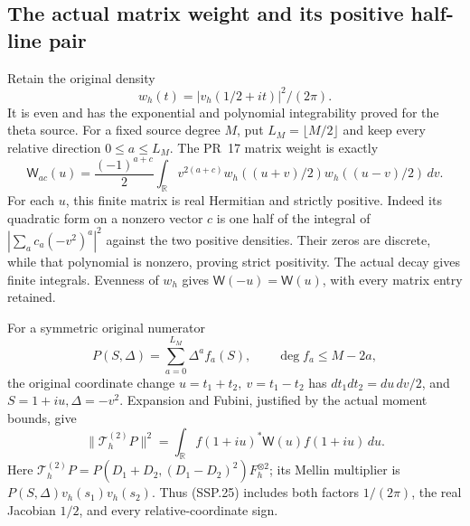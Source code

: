 \subsection{The actual matrix weight and its positive half-line pair}

Retain the original density
\[
 w_h(t)=|v_h(1/2+it)|^2/(2\pi).
 \tag{SSP.23}
\]
It is even and has the exponential and polynomial integrability
proved for the theta source.  For a fixed source degree \(M\),
put \(L_M=\lfloor M/2\rfloor\) and keep every relative direction
\(0\le a\le L_M\).  The PR~17 matrix weight is exactly
\[
 \mathsf W_{ac}(u)=\frac{(-1)^{a+c}}2
   \int_{\mathbb R}v^{2(a+c)}
       w_h((u+v)/2)w_h((u-v)/2)\,dv .
 \tag{SSP.24}
\]
For each \(u\), this finite matrix is real Hermitian and strictly
positive.  Indeed its quadratic form on a nonzero vector \(c\)
is one half of the integral of
\(\left|\sum_a c_a(-v^2)^a\right|^2\) against the two positive
densities.  Their zeros are discrete, while that polynomial is
nonzero, proving strict positivity.  The actual decay gives
finite integrals.  Evenness of \(w_h\) gives
\(\mathsf W(-u)=\mathsf W(u)\), with every matrix entry retained.

For a symmetric original numerator
\[
 P(S,\Delta)=\sum_{a=0}^{L_M}\Delta^af_a(S),\qquad
 \deg f_a\le M-2a,
\]
the original coordinate change
\(u=t_1+t_2,\ v=t_1-t_2\) has
\(dt_1dt_2=du\,dv/2\), and \(S=1+iu,\Delta=-v^2\).
Expansion and Fubini, justified by the actual moment bounds, give
\[
 \|\mathcal T_h^{(2)}P\|^2
   =\int_{\mathbb R}f(1+iu)^*\mathsf W(u)f(1+iu)\,du .
 \tag{SSP.25}
\]
Here \(\mathcal T_h^{(2)}P=
P(D_1+D_2,(D_1-D_2)^2)F_h^{\otimes2}\); its Mellin
multiplier is \(P(S,\Delta)v_h(s_1)v_h(s_2)\).
Thus (SSP.25) includes both factors \(1/(2\pi)\), the real
Jacobian \(1/2\), and every relative-coordinate sign.

